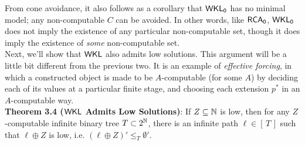 \documentclass{amsart}
\begin{document}
	From cone avoidance, it also follows as a corollary that $\operatorname{\sf{WKL_0}}$ has no minimal model; any non-computable $C$ can be avoided. In other words, like $\operatorname{\sf{RCA_0}}$, $\operatorname{\sf{WKL_0}}$ does not imply the existence of any particular non-computable set, though it does imply the existence of \textit{some} non-computable set.\\
	
	Next, we'll show that $\sf{WKL}$ also admits low solutions. This argument will be a little bit different from the previous two. It is an example of \textit{effective forcing}, in which a constructed object is made to be $A$-computable (for some $A$) by deciding each of its values at a particular finite stage, and choosing each extension $p^*$ in an $A$-computable way.\\
	
	\noindent \textbf{Theorem 3.4 ($\sf{WKL}$ Admits Low Solutions)}: If $Z\subseteq \mathbb{N}$ is low, then for any $Z$-computable infinite binary tree $T\subset 2^{\mathbb{N}}$, there is an infinite path $\ell\in [\,T\,]$ such that $\ell\oplus Z$ is low, i.e. $(\ell\oplus Z)'\leq_T \emptyset'$.
	
\end{document}
